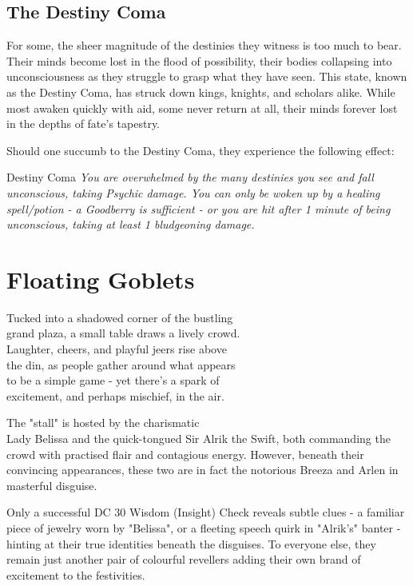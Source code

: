 \subsection*{The Destiny Coma}
{\entryfont For some, the sheer magnitude of the destinies they witness is too much to bear. Their minds become lost in the flood of possibility, their bodies collapsing into unconsciousness as they struggle to grasp what they have seen. This state, known as the Destiny Coma, has struck down kings, knights, and scholars alike. While most awaken quickly with aid, some never return at all, their minds forever lost in the depths of fate's tapestry.

Should one succumb to the Destiny Coma, they experience the following effect:}
\begingroup
	\DndSetThemeColor[PhbMauve]
	\begin{DndComment}{Destiny Coma}
		\textit{You are overwhelmed by the many destinies you see and fall unconscious, taking  Psychic damage. You can only be woken up by a healing spell/potion - a Goodberry is sufficient - or you are hit after 1 minute of being unconscious, taking at least 1 bludgeoning damage.}
	\end{DndComment}
\endgroup

\vfill\eject

\section*{Floating Goblets}
%
{\entryfont Tucked into a shadowed corner of the bustling\\grand plaza, a small table draws a lively crowd.\\ Laughter, cheers, and playful jeers rise above\\the din, as people gather around what appears\\to be a simple game - yet there's a spark of\\excitement, and perhaps mischief, in the air.

The "stall" is hosted by the charismatic\\Lady Belissa and the quick-tongued Sir Alrik the Swift, both commanding the crowd with practised flair and contagious energy. However, beneath their convincing appearances, these two are in fact the notorious Breeza and Arlen in masterful disguise.

Only a successful DC 30 Wisdom (Insight) Check reveals subtle clues - a familiar piece of jewelry worn by "Belissa", or a fleeting speech quirk in "Alrik's" banter - hinting at their true identities beneath the disguises. To everyone else, they remain just another pair of colourful revellers adding their own brand of excitement to the festivities.}

